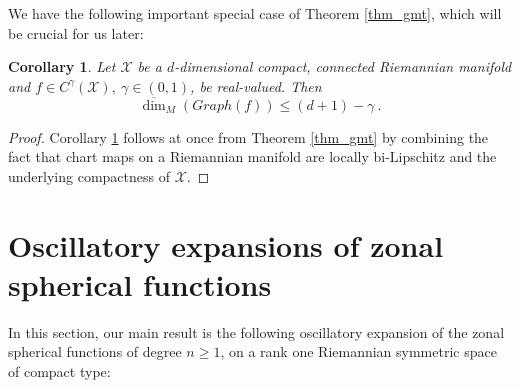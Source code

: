 \documentclass[12pt]{amsart}
\newtheorem{corollary}[theorem]{Corollary}
\theoremstyle{definition}
\numberwithin{equation}{section}
\begin{document}
We have the following important special case of Theorem \ref{thm_gmt}, which will be crucial for us later:
\begin{corollary} \label{graph_corollary}
Let $\mathcal{X}$ be a $d$-dimensional compact, connected Riemannian manifold  and $f \in C^\gamma(\mathcal{X}),\: \gamma \in (0,1)$, be real-valued. Then 
$$\overline{\dim}_M\left(Graph(f)\right) \le (d+1)-\gamma\:.$$
\end{corollary}
\begin{proof}
Corollary \ref{graph_corollary} follows at once from Theorem \ref{thm_gmt} by combining the fact that chart maps on a Riemannian manifold are locally bi-Lipschitz and the underlying compactness of $\mathcal{X}$.
\end{proof}

\section{Oscillatory expansions of zonal spherical functions}
\label{sec6}
In this section, our main result is the following oscillatory expansion of the zonal spherical functions of degree $n \ge 1$, on a rank one Riemannian symmetric space of compact type:
\end{document}
